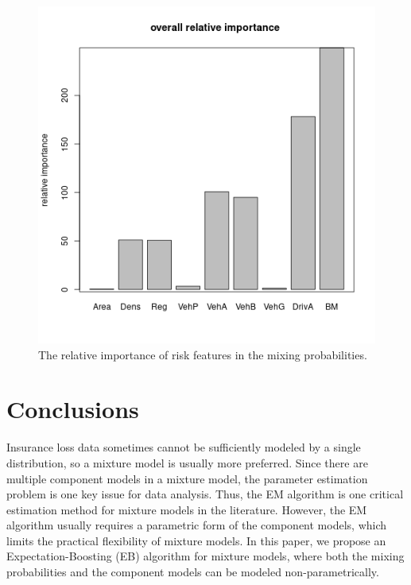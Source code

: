 \documentclass[11pt]{article}
\numberwithin{equation}{section}
\def\bx{\boldsymbol{x}}
\begin{document}
\begin{figure}[htp!]
							\includegraphics[width=0.4\linewidth]{../plots/sev/sev0}
	\caption{The relative importance of risk features in the mixing probabilities.}\label{sev-var-imp}
\end{figure}



\section{Conclusions}\label{sec:conclusions}
Insurance loss data sometimes cannot be sufficiently modeled by a single distribution, 
so a mixture model is usually more preferred. 
Since there are multiple component models in a mixture model, 
the parameter estimation problem is one key issue for data analysis. 
Thus, the EM algorithm is one critical estimation method for mixture models in the literature.
However, the EM algorithm usually requires a parametric form of the component models, which limits the practical flexibility of mixture models.
In this paper, we propose an Expectation-Boosting (EB) algorithm for mixture models, 
where both the mixing probabilities and the component models can be modeled non-parametrically. 
\end{document}
